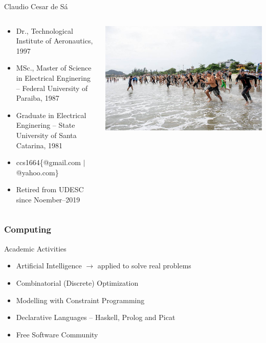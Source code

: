 \documentclass{beamer}
\begin{document}
\begin{frame}{Claudio Cesar de Sá}

\begin{columns} %
  \begin{column}{0.5\textwidth} %
   \begin{itemize}
    \item Dr., Technological Institute of Aeronautics, 1997
    \item MSc., Master of Science in Electrical Enginering -- Federal University of Paraiba, 1987
    \item Graduate in Electrical Enginering -- State University of Santa Catarina, 1981
    \item ccs1664\{@gmail.com $\mid$ @yahoo.com\}
    \item Retired from UDESC since Noember--2019
    \end{itemize}
  \end{column}
   \begin{column}{0.6\textwidth}  %
   \includegraphics[scale=0.2,keepaspectratio]{figures/enseada01.jpg}
  \end{column} %
 \end{columns}
 
\end{frame}


\subsubsection{Computing}
\begin{frame}{Academic Activities}

\begin{itemize}
  \item Artificial Intelligence $\rightarrow $ applied to solve real problems
  \item Combinatorial (Discrete) Optimization
  \item Modelling with Constraint Programming
  \item Declarative Languages -- Haskell, Prolog and Picat
  \item Free Software Community
\end{itemize}

\end{frame}
\end{document}
